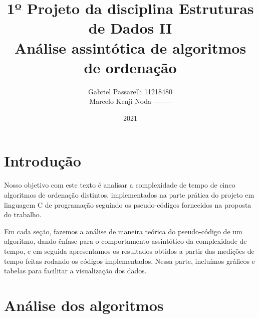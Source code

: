\documentclass{article}
\title{%
    1º Projeto da disciplina Estruturas de Dados II \\
     \large Análise assintótica de algoritmos de ordenação}
\author{Gabriel Passarelli 11218480\\ Marcelo Kenji Noda --------}
\date{2021}
\begin{document}
%
\maketitle
%
\newpage
\section{Introdução}
Nosso objetivo com este texto é analisar a complexidade de tempo de cinco algoritmos de ordenação distintos, implementados na parte prática do projeto em linguagem C de programação seguindo os pseudo-códigos fornecidos na proposta do trabalho.\par
%
Em cada seção, fazemos a análise de maneira teórica do pseudo-código de um algoritmo, dando ênfase para o comportamento assintótico da complexidade de tempo, e em seguida apresentamos os resultados obtidos a partir das medições de tempo feitas rodando os códigos implementados. Nessa parte, incluímos gráficos e tabelas para facilitar a visualização dos dados.
%
\section{Análise dos algoritmos}
\end{document}
